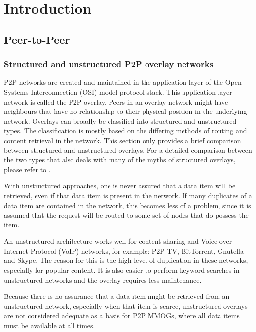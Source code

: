 \chapter{Introduction}
\label{chp:INTRO}


\section{Peer-to-Peer}

\subsection{Structured and unstructured P2P overlay networks}
\label{overlays}

P2P networks are created and maintained in the application layer of the Open Systems Interconnection (OSI) model protocol stack. This application
layer network is called the P2P overlay. Peers in an overlay network might have neighbours that have no relationship to their physical position in
the underlying network. Overlays can broadly be classified into structured and unstructured types. The classification is mostly based on the
differing methods of routing and content retrieval in the network. This section only provides a brief comparison between structured and unstructured
overlays. For a detailed comparison between the two types that also deals with many of the myths of structured overlays, please refer to
\cite{Castro_structured_overlay_myths}.

With unstructured approaches, one is never assured that a data item will be retrieved, even if that data item is present in the network. If many
duplicates of a data item are contained in the network, this becomes less of a problem, since it is assumed that the request will be routed to some
set of nodes that do  possess the item.

An unstructured architecture works well for content sharing and Voice over Internet Protocol (VoIP) networks, for example: P2P TV, BitTorrent,
Gnutella and Skype. The reason for this is the high level of duplication in these networks, especially for popular content. It is also easier to
perform keyword searches in unstructured networks and the overlay requires less maintenance.

Because there is no assurance that a data item might be retrieved from an unstructured network, especially when that item is scarce, unstructured
overlays are not considered adequate as a basis for P2P MMOGs, where all data items must be available at all times.

